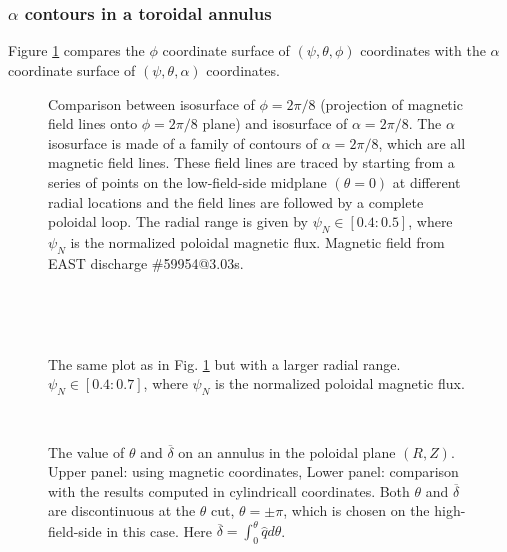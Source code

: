 \documentclass{llncs}
\begin{document}
\

\

\subsubsection{$\alpha$ contours in a toroidal annulus}

Figure \ref{17-9-18-1} compares the $\phi$ coordinate surface of $(\psi,
\theta, \phi)$ coordinates with the $\alpha$ coordinate surface of $(\psi,
\theta, \alpha)$ coordinates.

\begin{figure}[h]
  \caption{\label{17-9-18-1}Comparison between isosurface of $\phi = 2 \pi /
  8$ (projection of magnetic field lines onto $\phi = 2 \pi / 8$ plane) and
  isosurface of $\alpha = 2 \pi / 8$. The $\alpha$ isosurface is made of a
  family of contours of $\alpha = 2 \pi / 8$, which are all magnetic field
  lines. These field lines are traced by starting from a series of points on
  the low-field-side midplane $(\theta = 0)$ at different radial locations and
  the field lines are followed by a complete poloidal loop. The radial range
  is given by $\psi_N \in [0.4 : 0.5]$, where $\psi_N$ is the normalized
  poloidal magnetic flux. Magnetic field from EAST discharge \#59954@3.03s.}
\end{figure}

\

\

\begin{figure}[h]
  \caption{The same plot as in Fig. \ref{17-9-18-1} but with a larger radial
  range. $\psi_N \in [0.4 : 0.7]$, where $\psi_N$ is the normalized poloidal
  magnetic flux.}
\end{figure}

\begin{figure}[h]
  
  
  \
  \caption{The value of $\theta$ and $\overline{\delta}$ on an annulus in the
  poloidal plane $(R, Z)$. Upper panel: using magnetic coordinates, Lower
  panel: comparison with the results computed in cylindricall coordinates.
  Both $\theta$ and $\overline{\delta}$ are discontinuous at the $\theta$ cut,
  $\theta = \pm \pi$, which is chosen on the high-field-side in this case.
  Here $\overline{\delta} = \int_0^{\theta} \hat{q} d \theta$.}
\end{figure}
\end{document}
